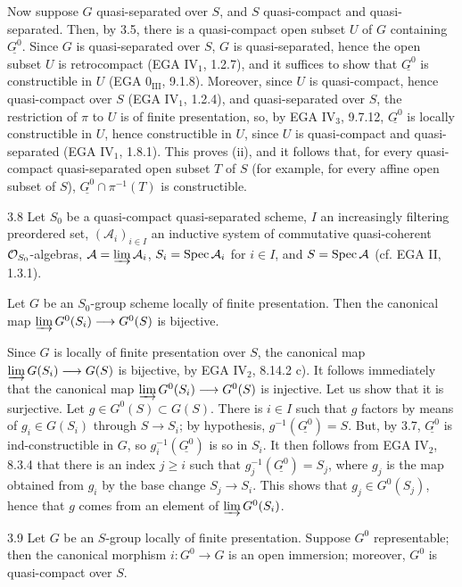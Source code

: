 Now suppose $G$ quasi-separated over $S$, and $S$ quasi-compact and quasi-separated. Then, by 3.5, there is a quasi-compact open subset $U$ of $G$ containing $\underline{G^0}$. Since $G$ is quasi-separated over $S$, $G$ is quasi-separated, hence the open subset $U$ is retrocompact (EGA IV$_1$, 1.2.7), and it suffices to show that $\underline{G^0}$ is constructible in $U$ (EGA 0$_{\mathrm{III}}$, 9.1.8). Moreover, since $U$ is quasi-compact, hence quasi-compact over $S$ (EGA IV$_1$, 1.2.4), and quasi-separated over $S$, the restriction of $\pi$ to $U$ is of finite presentation, so, by EGA IV$_3$, 9.7.12, $\underline{G^0}$ is locally constructible in $U$, hence constructible in $U$, since $U$ is quasi-compact and quasi-separated (EGA IV$_1$, 1.8.1). This proves (ii), and it follows that, for every quasi-compact quasi-separated open subset $T$ of $S$ (for example, for every affine open subset of $S$), $\underline{G^0}\cap\pi^{-1}(T)$ is constructible.
\begin{corollary}{3.8}\label{VIB.3.8}
Let $S_0$ be a quasi-compact quasi-separated scheme, $I$ an increasingly filtering preordered set, $(\mathcal A_i)_{i\in I}$ an inductive system of commutative quasi-coherent $\OO_{S_0}$-algebras, $\mathcal A=\varinjlim\mathcal A_i$, $S_i=\Spec\mathcal A_i$ for $i\in I$, and $S=\Spec\mathcal A$ (cf. EGA II, 1.3.1).

Let $G$ be an $S_0$-group scheme locally of finite presentation. Then the canonical map $\varinjlim G^0(S_i)\to G^0(S)$ is bijective.
\end{corollary}
Since $G$ is locally of finite presentation over $S$, the canonical map $\varinjlim G(S_i)\to G(S)$ is bijective, by EGA IV$_2$, 8.14.2 c). It follows immediately that the canonical map $\varinjlim G^0(S_i)\to G^0(S)$ is injective. Let us show that it is surjective. Let $g\in G^0(S)\subset G(S)$. There is $i\in I$ such that $g$ factors by means of $g_i\in G(S_i)$ through $S\to S_i$; by hypothesis, $g^{-1}(\underline{G^0})=S$. But, by 3.7, $\underline{G^0}$ is ind-constructible in $G$, so $g_i^{-1}(\underline{G^0})$ is so in $S_i$. It then follows from EGA IV$_2$, 8.3.4 that there is an index $j\ge i$ such that $g_j^{-1}(\underline{G^0})=S_j$, where $g_j$ is the map obtained from $g_i$ by the base change $S_j\to S_i$. This shows that $g_j\in G^0(S_j)$, hence that $g$ comes from an element of $\varinjlim G^0(S_i)$.
\begin{proposition}{3.9}\label{VIB.3.9}
Let $G$ be an $S$-group locally of finite presentation. Suppose $G^0$ representable; then the canonical morphism $i:G^0\to G$ is an open immersion; moreover, $G^0$ is quasi-compact over $S$.
\end{proposition}
